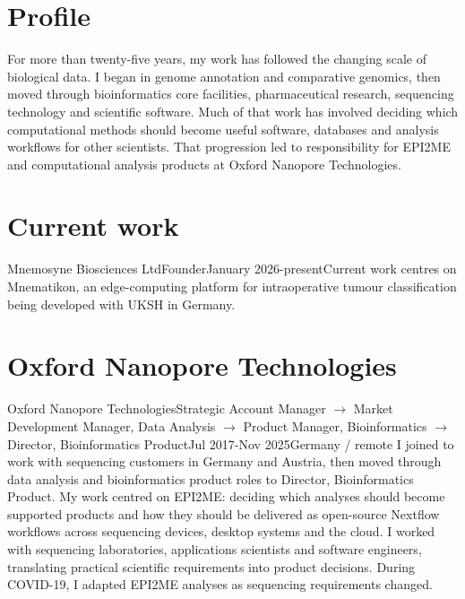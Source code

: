 \documentclass{vitae}
\begin{document}
\fancyhead[R]{}
\fancyfoot[L]{}


\section{Profile}
\begin{ExecutiveSummary}For more than twenty-five years, my work has followed the changing scale of biological data. I began in genome annotation and comparative genomics, then moved through bioinformatics core facilities, pharmaceutical research, sequencing technology and scientific software. Much of that work has involved deciding which computational methods should become useful software, databases and analysis workflows for other scientists. That progression led to responsibility for EPI2ME and computational analysis products at Oxford Nanopore Technologies.\end{ExecutiveSummary}

\section{Current work}
\begin{CvEntry}{Mnemosyne Biosciences Ltd}{Founder}{January 2026-present}{Current work centres on Mnematikon, an edge-computing platform for intraoperative tumour classification being developed with UKSH in Germany.}\end{CvEntry}

\section{Oxford Nanopore Technologies}
\begin{CvEntry}{Oxford Nanopore Technologies}{Strategic Account Manager $\rightarrow$ Market Development Manager, Data Analysis $\rightarrow$ Product Manager, Bioinformatics $\rightarrow$ Director, Bioinformatics Product}{Jul 2017-Nov 2025}{Germany / remote}
I joined to work with sequencing customers in Germany and Austria, then moved through data analysis and bioinformatics product roles to Director, Bioinformatics Product. My work centred on EPI2ME: deciding which analyses should become supported products and how they should be delivered as open-source Nextflow workflows across sequencing devices, desktop systems and the cloud. I worked with sequencing laboratories, applications scientists and software engineers, translating practical scientific requirements into product decisions. During COVID-19, I adapted EPI2ME analyses as sequencing requirements changed.\end{CvEntry}
\end{document}

